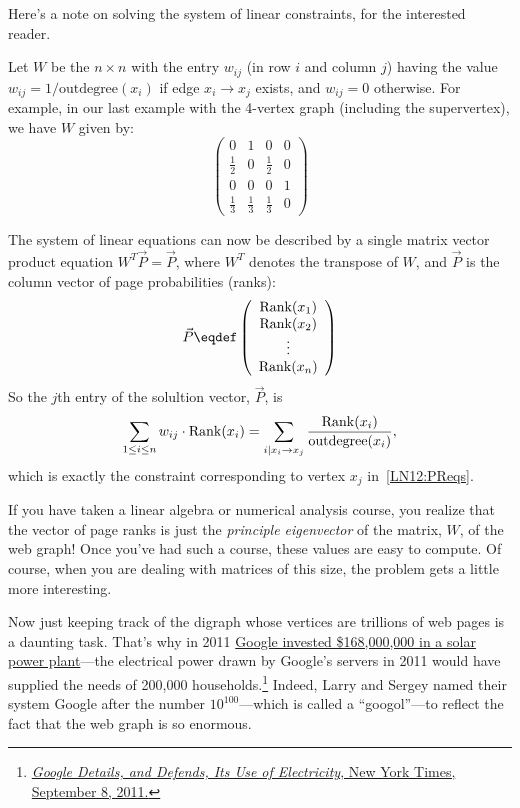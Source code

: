 \begin{editingnotes}
Here's a note on solving the system of linear constraints, for the
interested reader.

Let $W$ be the $n \times n$ with the entry $w_{ij}$ (in row $i$ and
column $j$) having the value $w_{ij} = 1/\text{outdegree}(x_i)$ if edge
$x_i \rightarrow x_j$ exists, and $w_{ij} = 0$ otherwise.  For example, in
our last example with the 4-vertex graph (including the supervertex), we have
$W$ given by:
\[
\left( \begin{array}{cccc}
    0 & 1 & 0 & 0 \\
    \frac{1}{2} & 0 & \frac{1}{2} & 0 \\
    0 & 0 & 0 & 1\\
    \frac{1}{3} & \frac{1}{3} & \frac{1}{3} & 0 \end{array} \right)
\]

The system of linear equations can now be described by a single matrix
vector product equation $W^T \vec{P} = \vec{P}$, where $W^T$ denotes the
transpose of $W$, and $\vec{P}$ is the column vector of page probabilities
(ranks):
\[\vec{P}\eqdef
\left( \begin{array}{c}
    \PRnk(x_1) \\
    \PRnk(x_2) \\
    \vdots \\
    \PRnk(x_n) \end{array} \right)
\]
So the $j$th entry of the solultion vector, $\vec{P}$, is
\[
\sum_{1\leq i \leq n} w_{ij} \cdot \operatorname{Rank}(x_i) =
\sum_{i \mid x_i \rightarrow x_j} \frac{\operatorname{Rank}(x_i)}{\text{outdegree}(x_i)},
\]
which is exactly the constraint corresponding to vertex $x_j$
in~\eqref{LN12:PReqs}.

If you have taken a linear algebra or numerical analysis course, you
realize that the vector of page ranks is just the \emph{principle
  eigenvector} of the matrix, $W$, of the web graph!  Once you've had such
a course, these values are easy to compute.  Of course, when you are
dealing with matrices of this size, the problem gets a little more
interesting.

\end{editingnotes}

Now just keeping track of the digraph whose vertices are trillions of
web pages is a daunting task.  That's why in 2011
\href{http://phys.org/news/2011-04-google-invests-million-solar-power.html}{Google
  invested \$168,000,000 in a solar power plant}---the electrical
power drawn by Google's servers in 2011 would have supplied the needs
of 200,000
households.\footnote{\href{http://www.nytimes.com/2011/09/09/technology/google-details-and-defends-its-use-of-electricity.html}{\emph{Google
      Details, and Defends, Its Use of Electricity}, New York Times,
    September 8, 2011.}}  Indeed, Larry and Sergey named their system
Google after the number $10^{100}$---which is called a ``googol''---to
reflect the fact that the web graph is so enormous.

